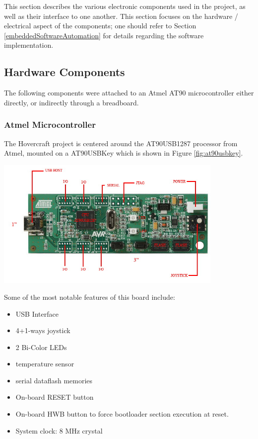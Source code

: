 This section describes the various electronic components used in the project, as well as their interface to one another.  This section focuses on the hardware / electrical aspect of the components; one should refer to Section \ref{embeddedSoftwareAutomation} for details regarding the software implementation.  

\subsection{Hardware Components}
The following components were attached to an Atmel AT90 microcontroller either directly, or indirectly through a breadboard.  

\subsubsection{Atmel Microcontroller}
The Hovercraft project is centered around the AT90USB1287 processor from Atmel, mounted on a AT90USBKey which is shown in Figure \ref{fig:at90usbkey}.


  \begin{center}
    \includegraphics[width=110mm]{imageSources/at90usbkey.png}
  \end{center}
  \label{fig:at90usbkey}


Some of the most notable features of this board include:
\begin{itemize}
\item USB Interface
\item 4+1-ways joystick
\item 2 Bi-Color LEDs
\item temperature sensor
\item serial dataflash memories
\item On-board RESET button 
\item On-board HWB button to force bootloader section execution at reset.
\item System clock: 8 MHz crystal
\end{itemize}

